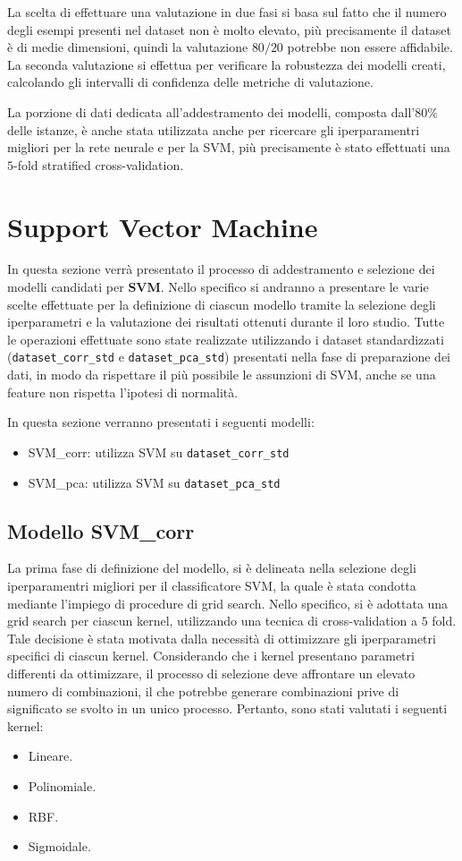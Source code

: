 La scelta di effettuare una valutazione in due fasi si basa sul fatto che il
numero degli esempi presenti nel dataset non è molto elevato, più precisamente
il dataset è di medie dimensioni, quindi la valutazione $80/20$ potrebbe non
essere affidabile. La seconda valutazione si effettua per verificare la
robustezza dei modelli creati, calcolando gli intervalli di confidenza delle
metriche di valutazione.

La porzione di dati dedicata all'addestramento dei modelli, composta dall'$80\%$
delle istanze, è anche stata utilizzata anche per ricercare gli iperparamentri
migliori per la rete neurale e per la SVM, più precisamente è stato effettuati
una $5$-fold stratified cross-validation.
\section{Support Vector Machine}
In questa sezione verrà presentato il processo di addestramento e selezione dei
modelli candidati per \textbf{SVM}. Nello specifico si andranno a presentare le
varie scelte effettuate per la definizione di ciascun modello tramite la selezione
degli iperparametri e la valutazione dei risultati ottenuti durante il loro studio.
Tutte le operazioni effettuate sono state realizzate utilizzando i dataset standardizzati
(\texttt{dataset\_corr\_std} e \texttt{dataset\_pca\_std}) presentati nella fase
di preparazione dei dati, in modo da rispettare il più possibile le assunzioni
di SVM, anche se una feature non rispetta l'ipotesi di normalità.

In questa sezione verranno presentati i seguenti modelli:
\begin{itemize}
    \item SVM\_corr: utilizza SVM su \texttt{dataset\_corr\_std}
    \item SVM\_pca: utilizza SVM su \texttt{dataset\_pca\_std}
\end{itemize}

\subsection{Modello SVM\_corr}
La prima fase di definizione del modello, si è delineata nella selezione degli
iperparamentri migliori per il classificatore SVM, la quale è stata
condotta mediante l'impiego di procedure di grid search. Nello specifico, si è
adottata una grid search per ciascun kernel, utilizzando una tecnica di
cross-validation a $5$ fold. Tale decisione è stata motivata dalla necessità di
ottimizzare gli iperparametri specifici di ciascun kernel. Considerando che i
kernel presentano parametri differenti da ottimizzare, il processo di selezione
deve affrontare un elevato numero di combinazioni, il che potrebbe generare
combinazioni prive di significato se svolto in un unico processo. Pertanto, sono
stati valutati i seguenti kernel:
\begin{itemize}
    \item Lineare.
    \item Polinomiale.
    \item RBF.
    \item Sigmoidale.
\end{itemize}

